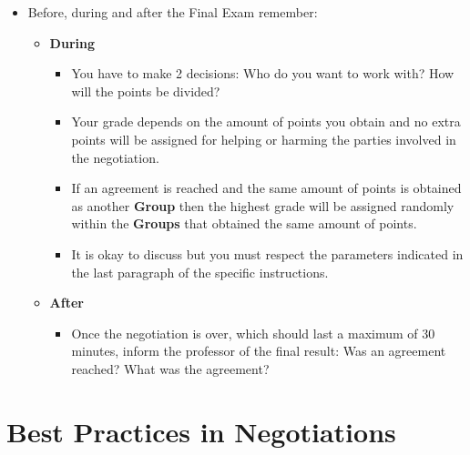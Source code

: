 \documentclass[
  ignorenonframetext,
]{beamer}
\providecommand{\tightlist}{%
  \setlength{\itemsep}{0pt}\setlength{\parskip}{0pt}}\usepackage{longtable,booktabs,array}
\begin{document}
\begin{frame}{}
\label{section-10}
\begin{itemize}
\item
  Before, during and after the Final Exam remember:

  \begin{itemize}
  \item
    \textbf{During}

    \begin{itemize}
    \tightlist
    \item
      You have to make 2 decisions: Who do you want to work with? How
      will the points be divided?
    \item
      Your grade depends on the amount of points you obtain and no extra
      points will be assigned for helping or harming the parties
      involved in the negotiation.
    \item
      If an agreement is reached and the same amount of points is
      obtained as another \textbf{Group} then the highest grade will be
      assigned randomly within the \textbf{Groups} that obtained the
      same amount of points.
    \item
      It is okay to discuss but you must respect the parameters
      indicated in the last paragraph of the specific instructions.
    \end{itemize}
  \item
    \textbf{After}

    \begin{itemize}
    \tightlist
    \item
      Once the negotiation is over, which should last a maximum of 30
      minutes, inform the professor of the final result: Was an
      agreement reached? What was the agreement?
    \end{itemize}
  \end{itemize}
\end{itemize}
\end{frame}

\section{Best Practices in
Negotiations}\label{best-practices-in-negotiations}
\end{document}
